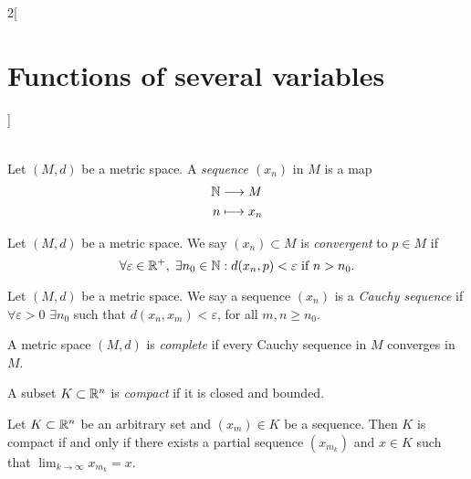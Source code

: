 \documentclass[../../../main.tex]{subfiles}
\begin{document}
\begin{multicols}{2}[\section{Functions of several variables}]
\begin{definition}
\begin{gather*}
        \end{gather*}
    \end{definition}
    \begin{definition}
        Let $(M,d)$ be a metric space. A \textit{sequence $(x_n)$} in $M$ is a map
        \begin{align*}
            \mathbb{N} & \longrightarrow M \\
            n   & \longmapsto x_n
        \end{align*}
    \end{definition}
    \begin{definition}
        Let $(M,d)$ be a metric space. We say $(x_n)\subset M$ is \textit{convergent} to $p\in M$ if $$\forall\varepsilon\in\mathbb{R}^+,\;\exists n_0\in\mathbb{N} :d(x_n,p)<\varepsilon\text{ if }n>n_0.$$
    \end{definition}
    \begin{definition}
        Let $(M,d)$ be a metric space. We say a sequence $(x_n)$ is a \textit{Cauchy sequence} if $\forall\varepsilon>0$ $\exists n_0$ such that $d(x_n,x_m)<\varepsilon$, for all $m,n\geq n_0$.
    \end{definition}
    \begin{definition}
        A metric space $(M,d)$ is \textit{complete} if every Cauchy sequence in $M$ converges in $M$.
        \label{FOSV_complete}
    \end{definition}
    \begin{definition}
        A subset $K\subset\mathbb{R}^n$ is \textit{compact} if it is closed and bounded.
    \end{definition}
    \begin{theorem}
        Let $K\subset\mathbb{R}^n$ be an arbitrary set and $(x_m)\in K$ be a sequence. Then $K$ is compact if and only if there exists a partial sequence $(x_{m_k})$ and $x\in K$ such that $\displaystyle\lim_{k\to\infty}x_{m_k}=x$.
    \end{theorem}

\end{multicols}
\end{document}
